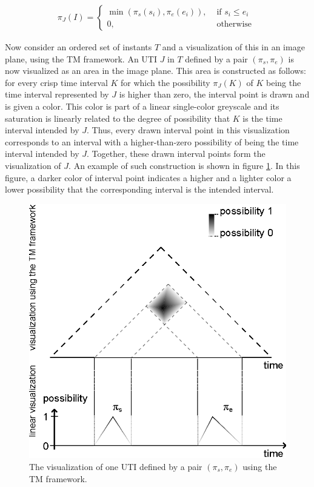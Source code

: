 \begin{align}
\pi_J(I) = \begin{cases}
 \min \left(\pi_s (s_i), \pi_e (e_i) \right), & \mbox{ if } s_i \leq e_i\\
0, & \mbox{ otherwise }
\end{cases}
\end{align}

Now consider an ordered set of instants $T$ and a visualization of this in an image plane, using the TM framework. An UTI $J$ in $T$ defined by a pair $(\pi_s, \pi_e)$ is now visualized as an area in the image plane. This area is constructed as follows: for every crisp time interval $K$ for which the possibility $\pi_J(K)$ of $K$ being the time interval represented by $J$ is higher than zero, the interval point is drawn and is given a color. This color is part of a linear single-color greyscale and its saturation is linearly related to the degree of possibility that $K$ is the time interval intended by $J$. Thus, every drawn interval point in this visualization corresponds to an interval with a higher-than-zero possibility of being the time interval intended by $J$. Together, these drawn interval points form the visualization of $J$. An example of such construction is shown in figure \ref{fig:tm-ill-const-ex}. In this figure, a darker color of interval point indicates a higher and a lighter color a lower possibility that the corresponding interval is the intended interval.

\begin{figure}[h]
	\centering
	\includegraphics[width=0.8\columnwidth]{graphs/TM_model_ill_known.eps}
	\caption{The visualization of one UTI defined by a pair $(\pi_s, \pi_e)$ using the TM framework.}
	\label{fig:tm-ill-const-ex}
\end{figure}

